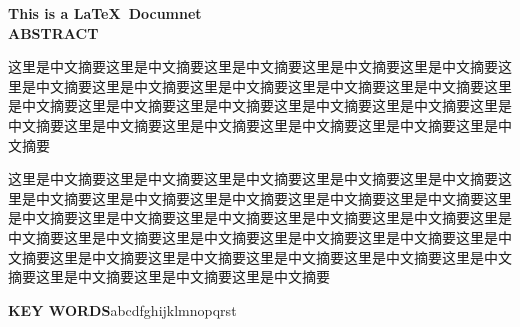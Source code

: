 \begin{center}
  {\bf{}This is a \LaTeX~Documnet}\\[1em]
  {\bf{}ABSTRACT}
\end{center}

这里是中文摘要这里是中文摘要这里是中文摘要这里是中文摘要这里是中文摘要这里是中文摘要这里是中文摘要这里是中文摘要这里是中文摘要这里是中文摘要这里是中文摘要这里是中文摘要这里是中文摘要这里是中文摘要这里是中文摘要这里是中文摘要这里是中文摘要这里是中文摘要这里是中文摘要这里是中文摘要这里是中文摘要

这里是中文摘要这里是中文摘要这里是中文摘要这里是中文摘要这里是中文摘要这里是中文摘要这里是中文摘要这里是中文摘要这里是中文摘要这里是中文摘要这里是中文摘要这里是中文摘要这里是中文摘要这里是中文摘要这里是中文摘要这里是中文摘要这里是中文摘要这里是中文摘要这里是中文摘要这里是中文摘要这里是中文摘要这里是中文摘要这里是中文摘要这里是中文摘要这里是中文摘要这里是中文摘要这里是中文摘要这里是中文摘要这里是中文摘要

\begin{flushleft}
  {\bf{}KEY WORDS}{\quad{}abc\quad dfg\quad hijklmn\quad opqrst}
\end{flushleft}

